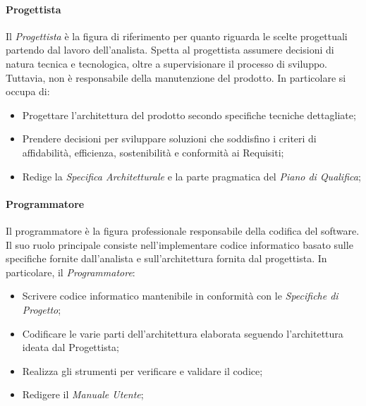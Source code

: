 \documentclass{article}
\begin{document}
        \paragraph{Progettista}\label{progettista}Il \textit{Progettista} è la figura di riferimento per quanto riguarda le scelte progettuali partendo dal lavoro dell'analista. Spetta al progettista assumere decisioni di natura tecnica e tecnologica, oltre a supervisionare il processo di sviluppo. Tuttavia, non è responsabile della manutenzione del prodotto. In particolare si occupa di:
        \begin{itemize}
            \item Progettare l'architettura del prodotto secondo specifiche tecniche dettagliate;
            \item Prendere decisioni per sviluppare soluzioni che soddisfino i criteri di affidabilità, efficienza, sostenibilità e conformità ai Requisiti;
            \item Redige la \textit{Specifica Architetturale} e la parte pragmatica del \textit{Piano di Qualifica};
        \end{itemize} 
        \paragraph{Programmatore}\label{programmatore}Il programmatore è la figura professionale responsabile della codifica del software. Il suo ruolo principale consiste nell'implementare codice informatico basato sulle specifiche fornite dall'analista e sull'architettura fornita dal progettista. In particolare, il \textit{Programmatore}:
        \begin{itemize}
            \item Scrivere codice informatico mantenibile in conformità con le \textit{Specifiche di Progetto};
            \item Codificare le varie parti dell'architettura elaborata seguendo l'architettura ideata dal Progettista;
            \item Realizza gli strumenti per verificare e validare il codice;
            \item Redigere il \textit{Manuale Utente};
        \end{itemize} 
\end{document}
